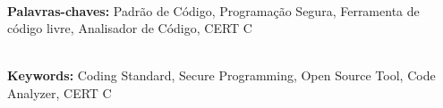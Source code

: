 \documentclass[a4paper,12pt]{pkg/monografia}
\begin{document}





\\
\noindent \textbf{Palavras-chaves:} Padrão de Código, Programação Segura, Ferramenta de código livre, Analisador de Código, CERT C


\\
\noindent \textbf{Keywords:} Coding Standard, Secure Programming, Open Source Tool, Code Analyzer, CERT C


\tableofcontents
\thispagestyle{empty}

\listoffigures
\thispagestyle{empty}

\listoftables
\thispagestyle{empty}

% 

\pagestyle{ruledheader}





% 

%

\renewcommand{\bibname}{Referências}

\nocite{*}


%

\end{document}
